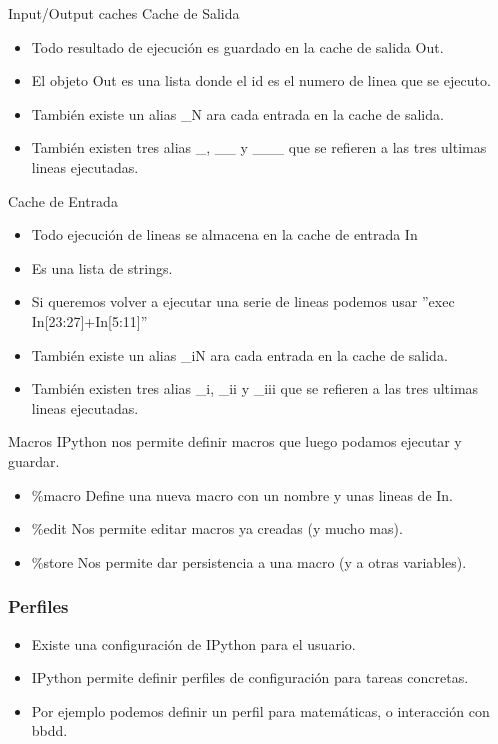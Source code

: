 \documentclass[10pt]{beamer}
\begin{document}
  \begin{frame}{Input/Output caches}
    Cache de Salida
    \begin{itemize}
      \item Todo resultado de ejecución es guardado en la cache de salida Out.
      \item El objeto Out es una lista donde el id es el numero de linea que se ejecuto.
      \item También existe un alias \_N ara cada entrada en la cache de salida.
      \item También existen tres alias \_, \_\_ y \_\_\_  que se refieren a las tres ultimas lineas ejecutadas.
    \end{itemize}

    Cache de Entrada
    \begin{itemize}
      \item Todo ejecución de lineas se almacena en la cache de entrada In
      \item Es una lista de strings.
      \item Si queremos volver a ejecutar una serie de lineas podemos usar ''exec In[23:27]+In[5:11]''
      \item También existe un alias \_iN ara cada entrada en la cache de salida.
      \item También existen tres alias \_i, \_ii y \_iii  que se refieren a las tres ultimas lineas ejecutadas.
    \end{itemize}
  \end{frame}

  \begin{frame}{Macros}
    IPython nos permite definir macros que luego podamos ejecutar y guardar.
    \begin{itemize}
      \item \%macro Define una nueva macro con un nombre y unas lineas de In.
      \item \%edit Nos permite editar macros ya creadas (y mucho mas).
      \item \%store Nos permite dar persistencia a una macro (y a otras variables).
    \end{itemize}
  \end{frame}

  \begin{frame}
    \frametitle{Perfiles}
    \begin{itemize}
      \item Existe una configuración de IPython para el usuario.
      \item IPython permite definir perfiles de configuración para tareas concretas.
      \item Por ejemplo podemos definir un perfil para matemáticas, o interacción con bbdd.
    \end{itemize}
  \end{frame}
\end{document}
